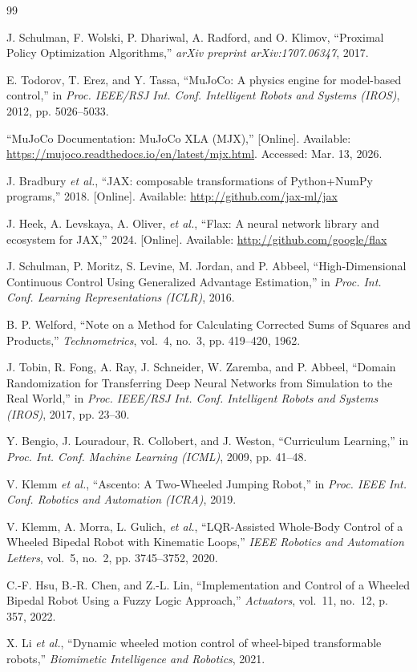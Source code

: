 \documentclass[conference]{IEEEtran}
\begin{document}

\begin{thebibliography}{99}

J. Schulman, F. Wolski, P. Dhariwal, A. Radford, and O. Klimov,
``Proximal Policy Optimization Algorithms,''
\emph{arXiv preprint arXiv:1707.06347}, 2017.

E. Todorov, T. Erez, and Y. Tassa,
``MuJoCo: A physics engine for model-based control,''
in \emph{Proc. IEEE/RSJ Int. Conf. Intelligent Robots and Systems (IROS)}, 2012, pp. 5026--5033.

``MuJoCo Documentation: MuJoCo XLA (MJX),''
[Online]. Available: \url{https://mujoco.readthedocs.io/en/latest/mjx.html}. Accessed: Mar. 13, 2026.

J. Bradbury \emph{et al.},
``JAX: composable transformations of Python+NumPy programs,''
2018. [Online]. Available: \url{http://github.com/jax-ml/jax}

J. Heek, A. Levskaya, A. Oliver, \emph{et al.},
``Flax: A neural network library and ecosystem for JAX,''
2024. [Online]. Available: \url{http://github.com/google/flax}

J. Schulman, P. Moritz, S. Levine, M. Jordan, and P. Abbeel,
``High-Dimensional Continuous Control Using Generalized Advantage Estimation,''
in \emph{Proc. Int. Conf. Learning Representations (ICLR)}, 2016.

B. P. Welford,
``Note on a Method for Calculating Corrected Sums of Squares and Products,''
\emph{Technometrics}, vol.~4, no.~3, pp. 419--420, 1962.

J. Tobin, R. Fong, A. Ray, J. Schneider, W. Zaremba, and P. Abbeel,
``Domain Randomization for Transferring Deep Neural Networks from Simulation to the Real World,''
in \emph{Proc. IEEE/RSJ Int. Conf. Intelligent Robots and Systems (IROS)}, 2017, pp. 23--30.

Y. Bengio, J. Louradour, R. Collobert, and J. Weston,
``Curriculum Learning,''
in \emph{Proc. Int. Conf. Machine Learning (ICML)}, 2009, pp. 41--48.

V. Klemm \emph{et al.},
``Ascento: A Two-Wheeled Jumping Robot,''
in \emph{Proc. IEEE Int. Conf. Robotics and Automation (ICRA)}, 2019.

V. Klemm, A. Morra, L. Gulich, \emph{et al.},
``LQR-Assisted Whole-Body Control of a Wheeled Bipedal Robot with Kinematic Loops,''
\emph{IEEE Robotics and Automation Letters}, vol.~5, no.~2, pp. 3745--3752, 2020.

C.-F. Hsu, B.-R. Chen, and Z.-L. Lin,
``Implementation and Control of a Wheeled Bipedal Robot Using a Fuzzy Logic Approach,''
\emph{Actuators}, vol.~11, no.~12, p. 357, 2022.

X. Li \emph{et al.},
``Dynamic wheeled motion control of wheel-biped transformable robots,''
\emph{Biomimetic Intelligence and Robotics}, 2021.

\end{thebibliography}
\end{document}
